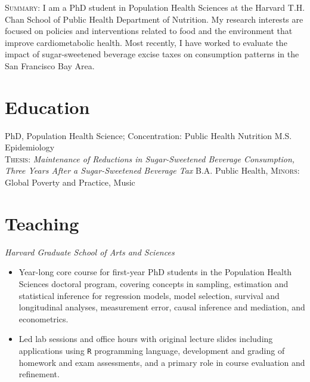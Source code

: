 \documentclass{cv_style}
\begin{document}
\begin{center}
\end{center}

\begin{adjustwidth}{0.7cm}{0.7cm} \parskip 8pt \begin{small} \textsc{Summary:} I am a PhD student in Population Health Sciences at the Harvard T.H. Chan School of Public Health Department of Nutrition. My research interests are focused on policies and interventions related to food and the environment that improve cardiometabolic health. Most recently, I have worked to evaluate the impact of sugar-sweetened beverage excise taxes on consumption patterns in the San Francisco Bay Area.
\end{small}
\end{adjustwidth}

\parskip -5pt 
\section{Education}
\parskip -5pt
\parskip -4pt \noindent PhD, Population Health Science; Concentration: Public Health Nutrition
\parskip -4pt M.S. Epidemiology \\
  \hangindent=0.7cm \rightskip=1cm \textsc{Thesis}: \textit{Maintenance of Reductions in Sugar-Sweetened Beverage Consumption, \newline Three Years After a Sugar-Sweetened Beverage Tax}
\parskip -8pt  
\parskip -4pt \noindent B.A. Public Health, \textsc{Minors:} Global Poverty and Practice, Music

\parskip -5pt 
\section{Teaching}
\textit{Harvard Graduate School of Arts and Sciences}
\begin{itemize}
  \vspace{0em} \item Year-long core course for first-year PhD students in the Population Health Sciences doctoral program, covering concepts in sampling, estimation and statistical inference for regression models, model selection, survival and longitudinal analyses, measurement error, causal inference and mediation, and econometrics. 
  \item \parskip 1pt Led lab sessions and office hours with original lecture slides including applications using \texttt{R} programming language, development and grading of homework and exam assessments, and a primary role in course evaluation and refinement.  
\end{itemize}
\end{document}
